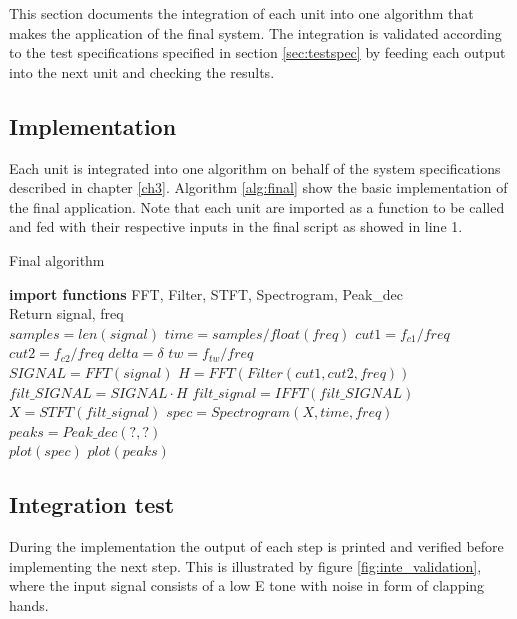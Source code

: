 This section documents the integration of each unit into one algorithm that makes the application of the final system. The integration is validated according to the test specifications specified in section \ref{sec:testspec} by feeding each output into the next unit and checking the results. 

\subsection{Implementation}
Each unit is integrated into one algorithm on behalf of the system specifications described in chapter \ref{ch3}. Algorithm \ref{alg:final} show the basic implementation of the final application. Note that each unit are imported as a function to be called and fed with their respective inputs in the final script as showed in line 1.
\begin{algorithm}[H]
\caption{Final algorithm}
\begin{algorithmic}[1]
\State \textbf{import functions} FFT, Filter, STFT, Spectrogram, Peak\_dec  
\\
\State Return signal, freq 
\EndProcedure 
\\
\State $samples = len(signal)$ 
\State $time   = samples/float(freq)$
\State $cut1 = f_{c1}/freq$ 
\State $cut2 = f_{c2}/freq$
\State $delta = \delta$
\State $tw = f_{tw}/freq$
\\
\State $SIGNAL = FFT(signal) $
\State $H = FFT(Filter(cut1,cut2,freq))$
\State $filt\_SIGNAL = SIGNAL \cdot H$
\State $filt\_signal = IFFT(filt\_SIGNAL)$  
\EndProcedure 
\\
\State $X = STFT(filt\_signal)$
\State $spec = Spectrogram(X,time,freq)$
\State $peaks = Peak\_dec(?,?)$
\EndProcedure
\\
\State $plot(spec)$ 
\State $plot(peaks)$
\EndProcedure
\end{algorithmic}
\label{alg:final}
\end{algorithm}      

\subsection{Integration test}
During the implementation the output of each step is printed and verified before implementing the next step. This is illustrated by figure \ref{fig:inte_validation}, where the input signal consists of a low E tone with noise in form of clapping hands.  

